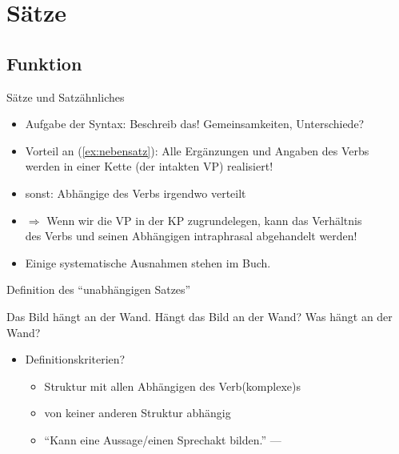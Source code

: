 \section{Sätze}

\subsection{Funktion}

\begin{frame}
  {Sätze und Satzähnliches}
  \pause
  \begin{exe}
    \pause
    \pause
    \pause
  \end{exe}
  \pause
  \Halbzeile
  \begin{itemize}[<+->]
    \item Aufgabe der Syntax: \alert{Beschreib das!} Gemeinsamkeiten, Unterschiede?
    \item Vorteil an (\ref{ex:nebensatz}): \alert{Alle Ergänzungen und Angaben des Verbs\\
      werden in einer Kette (der intakten VP) realisiert!}
    \item sonst: Abhängige des Verbs irgendwo verteilt
    \item $\Rightarrow$ Wenn wir die VP in der KP zugrundelegen, kann das Verhältnis\\
      des Verbs und seinen Abhängigen intraphrasal abgehandelt werden!
    \item \alert{Einige systematische Ausnahmen stehen im Buch.}
  \end{itemize}
\end{frame}

\begin{frame}
  {Definition des "`unabhängigen Satzes"'}
  \pause
  \begin{exe}
    \ex Das Bild hängt an der Wand.
    \pause
    \ex Hängt das Bild an der Wand?
    \pause
    \ex Was hängt an der Wand?
  \end{exe}
  \pause
  \begin{itemize}[<+->]
    \item Definitionskriterien?
      \begin{itemize}[<+->]
        \item Struktur mit \alert{allen Abhängigen} des Verb(komplexe)s
        \item \alert{von keiner anderen Struktur abhängig}
          \Halbzeile
        \item "`Kann eine Aussage\slash einen Sprechakt bilden."' \pause --- 
      \end{itemize}
  \end{itemize}
\end{frame}


